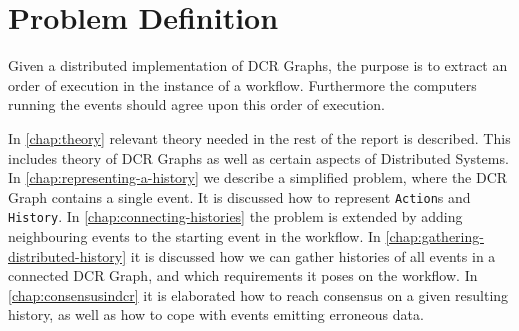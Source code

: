 \chapter{Problem Definition} %
	Given a distributed implementation of DCR Graphs, the purpose is to extract an order of execution in the instance of a workflow. Furthermore the computers running the events should agree upon this order of execution.
	
	\newpar
	In \autoref{chap:theory} relevant theory needed in the rest of the report is described. This includes theory of DCR Graphs as well as certain aspects of Distributed Systems. In \autoref{chap:representing-a-history} we describe a simplified problem, where the DCR Graph contains a single event. It is discussed how to represent \texttt{Action}s and \texttt{History}. In \autoref{chap:connecting-histories} the problem is extended by adding neighbouring events to the starting event in the workflow. In \autoref{chap:gathering-distributed-history} it is discussed how we can gather histories of all events in a connected DCR Graph, and which requirements it poses on the workflow. In \autoref{chap:consensusindcr} it is elaborated how to reach consensus on a given resulting history, as well as how to cope with events emitting erroneous data.
	
